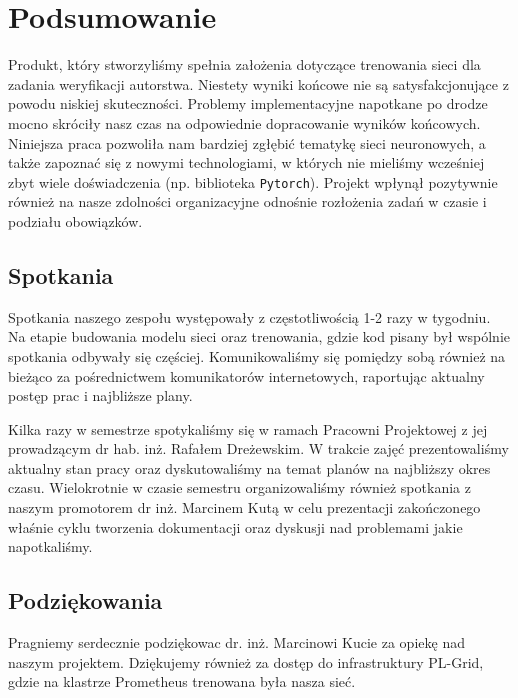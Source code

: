 \newpage
\section{Podsumowanie}

Produkt, który stworzyliśmy spełnia założenia dotyczące trenowania sieci dla zadania weryfikacji autorstwa.
Niestety wyniki końcowe nie są satysfakcjonujące z powodu niskiej skuteczności. Problemy implementacyjne 
napotkane po drodze mocno skróciły nasz czas na odpowiednie dopracowanie wyników końcowych.
\newline
\newline
Niniejsza praca pozwoliła nam bardziej zgłębić tematykę sieci neuronowych, 
a także zapoznać się z nowymi technologiami, w których nie mieliśmy wcześniej zbyt wiele doświadczenia
(np. biblioteka \texttt{Pytorch}). Projekt wpłynął pozytywnie również na nasze zdolności organizacyjne
odnośnie rozłożenia zadań w czasie i podziału obowiązków.

\subsection{Spotkania}
Spotkania naszego zespołu występowały z częstotliwością 1-2 razy w tygodniu. Na etapie
budowania modelu sieci oraz trenowania, gdzie kod pisany był wspólnie spotkania odbywały się częściej.
Komunikowaliśmy się pomiędzy sobą również na bieżąco za pośrednictwem komunikatorów internetowych, 
raportując aktualny postęp prac i najbliższe plany.

Kilka razy w semestrze spotykaliśmy się w ramach Pracowni Projektowej z jej prowadzącym dr hab. inż. Rafałem Dreżewskim.
W trakcie zajęć prezentowaliśmy aktualny stan pracy oraz dyskutowaliśmy na temat planów na najbliższy okres czasu.
\newline
\newline
Wielokrotnie w czasie semestru organizowaliśmy również spotkania z naszym promotorem dr inż. Marcinem Kutą 
w celu prezentacji zakończonego właśnie cyklu tworzenia dokumentacji oraz dyskusji nad problemami jakie napotkaliśmy.

\subsection{Podziękowania}
Pragniemy serdecznie podziękowac dr. inż. Marcinowi Kucie za opiekę nad naszym projektem.
Dziękujemy również za dostęp do infrastruktury PL-Grid, gdzie na klastrze Prometheus trenowana była
nasza sieć.